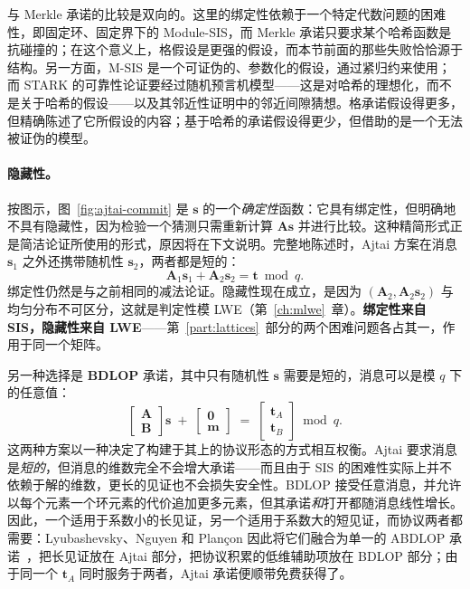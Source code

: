 与 Merkle 承诺的比较是双向的。这里的绑定性依赖于一个特定代数问题的困难性，即固定环、固定界下的 Module-SIS，而 Merkle 承诺只要求某个哈希函数是抗碰撞的；在这个意义上，格假设是更强的假设，而本节前面的那些失败恰恰源于结构。另一方面，M-SIS 是一个可证伪的、参数化的假设，通过紧归约来使用；而 STARK 的可靠性论证要经过随机预言机模型——这是对哈希的理想化，而不是关于哈希的假设——以及其邻近性证明中的邻近间隙猜想。格承诺假设得更多，但精确陈述了它所假设的内容；基于哈希的承诺假设得更少，但借助的是一个无法被证伪的模型。

\paragraph{隐藏性。}
按图示，图~\ref{fig:ajtai-commit} 是 $\mathbf{s}$ 的一个\emph{确定性}函数：它具有绑定性，但明确地不具有隐藏性，因为检验一个猜测只需重新计算 $\mathbf{A}\mathbf{s}$ 并进行比较。这种精简形式正是简洁论证所使用的形式，原因将在下文说明。完整地陈述时，Ajtai 方案在消息 $\mathbf{s}_1$ 之外还携带随机性 $\mathbf{s}_2$，两者都是短的：
\[
  \mathbf{A}_1\mathbf{s}_1 + \mathbf{A}_2\mathbf{s}_2 = \mathbf{t} \bmod q .
\]
绑定性仍然是与之前相同的减法论证。隐藏性现在成立，是因为 $(\mathbf{A}_2,\mathbf{A}_2\mathbf{s}_2)$ 与均匀分布不可区分，这就是判定性模 LWE（第~\ref{ch:mlwe}~章）。\textbf{绑定性来自 SIS，隐藏性来自 LWE}——第~\ref{part:lattices}~部分的两个困难问题各占其一，作用于同一个矩阵。

另一种选择是 \textbf{BDLOP} 承诺，其中只有随机性 $\mathbf{s}$ 需要是短的，消息可以是模 $q$ 下的任意值：
\[
  \begin{bmatrix}\mathbf{A}\\ \mathbf{B}\end{bmatrix}\mathbf{s}
  \;+\;\begin{bmatrix}\mathbf{0}\\ \mathbf{m}\end{bmatrix}
  \;=\;\begin{bmatrix}\mathbf{t}_A\\ \mathbf{t}_B\end{bmatrix} \bmod q .
\]
这两种方案以一种决定了构建于其上的协议形态的方式相互权衡。Ajtai 要求消息是\emph{短的}，但消息的维数完全不会增大承诺——而且由于 SIS 的困难性实际上并不依赖于解的维数，更长的见证也不会损失安全性。BDLOP 接受任意消息，并允许以每个元素一个环元素的代价追加更多元素，但其承诺\emph{和}打开都随消息线性增长。因此，一个适用于系数小的长见证，另一个适用于系数大的短见证，而协议两者都需要：Lyubashevsky、Nguyen 和 Plan\c{c}on 因此将它们融合为单一的 ABDLOP 承诺~\cite{lnp2022}，把长见证放在 Ajtai 部分，把协议积累的低维辅助项放在 BDLOP 部分；由于同一个 $\mathbf{t}_A$ 同时服务于两者，Ajtai 承诺便顺带免费获得了。

